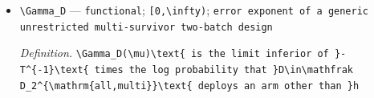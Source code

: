 \documentclass{article}
\begin{document}
\begin{itemize}
  \par\smallskip\noindent\emph{Definition.} \texttt{\textbackslash{}\allowbreak{}mathfrak D\_\allowbreak{}2\textasciicircum{}\{\textbackslash{}\allowbreak{}mathrm\{all,\allowbreak{}multi\}\allowbreak{}\}\allowbreak{}=\allowbreak{}\textbackslash{}\allowbreak{}bigcup\_\allowbreak{}\{m=\allowbreak{}2\}\allowbreak{}\textasciicircum{}\{K-\allowbreak{}1\}\allowbreak{}\textbackslash{}\allowbreak{}\{D(\textbackslash{}\allowbreak{}rho,\allowbreak{}a,\allowbreak{}\textbackslash{}\allowbreak{}\{b\_\allowbreak{}J\textbackslash{}\allowbreak{}\}\allowbreak{}\_\allowbreak{}\{J\textbackslash{}\allowbreak{}in\textbackslash{}\allowbreak{}mathcal J\_\allowbreak{}m\}\allowbreak{}):\allowbreak{}0<\textbackslash{}\allowbreak{}rho<1,\allowbreak{}\textbackslash{}\allowbreak{} a\textbackslash{}\allowbreak{}in\textbackslash{}\allowbreak{}mathcal W,\allowbreak{}\textbackslash{}\allowbreak{} b\_\allowbreak{}J\textbackslash{}\allowbreak{}in\textbackslash{}\allowbreak{}operatorname\{int\}\allowbreak{}\textbackslash{}\allowbreak{}Sigma\_\allowbreak{}J\textbackslash{}\allowbreak{}text\{ for every \}\allowbreak{}J\textbackslash{}\allowbreak{}in\textbackslash{}\allowbreak{}mathcal J\_\allowbreak{}m\textbackslash{}\allowbreak{}\}\allowbreak{}\textbackslash{}\allowbreak{}text\{,\allowbreak{} where batch one uses \}\allowbreak{}\textbackslash{}\allowbreak{}rho a\textbackslash{}\allowbreak{}text\{,\allowbreak{} retains its top \}\allowbreak{}m\textbackslash{}\allowbreak{}text\{ empirical arms,\allowbreak{} and branch \}\allowbreak{}J\textbackslash{}\allowbreak{}text\{ uses \}\allowbreak{}(1-\allowbreak{}\textbackslash{}\allowbreak{}rho)b\_\allowbreak{}J\textbackslash{}\allowbreak{}text\{ over its survivors\}\allowbreak{}}
  \item \texttt{\textbackslash{}\allowbreak{}Gamma\_\allowbreak{}D} --- \texttt{functional}; \texttt{[0,\allowbreak{}\textbackslash{}\allowbreak{}infty)}; \texttt{error exponent of a generic unrestricted multi-\allowbreak{}survivor two-\allowbreak{}batch design}
  \par\smallskip\noindent\emph{Definition.} \texttt{\textbackslash{}\allowbreak{}Gamma\_\allowbreak{}D(\textbackslash{}\allowbreak{}mu)\textbackslash{}\allowbreak{}text\{ is the limit inferior of \}\allowbreak{}-\allowbreak{}T\textasciicircum{}\{-\allowbreak{}1\}\allowbreak{}\textbackslash{}\allowbreak{}text\{ times the log probability that \}\allowbreak{}D\textbackslash{}\allowbreak{}in\textbackslash{}\allowbreak{}mathfrak D\_\allowbreak{}2\textasciicircum{}\{\textbackslash{}\allowbreak{}mathrm\{all,\allowbreak{}multi\}\allowbreak{}\}\allowbreak{}\textbackslash{}\allowbreak{}text\{ deploys an arm other than \}\allowbreak{}h}
\end{itemize}
\end{document}
